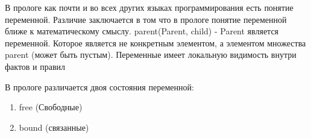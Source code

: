 \documentclass[../main.tex]{subfile}
\begin{document}
	В прологе как почти и во всех других языках программирования есть понятие переменной. 
	Различие заключается в том что в прологе понятие переменной ближе к математическому смыслу.
	parent(Parent, child) - Parent является переменной. Которое является не конкретным элементом, а элементом множества parent (может быть пустым).
	Переменные имеет локальную видимость внутри фактов и правил

	В прологе различается двоя состояния переменной:
	\begin{enumerate}[1)]
		\item free (Свободные)
		\item bound (связанные)
	\end{enumerate}
\end{document}
